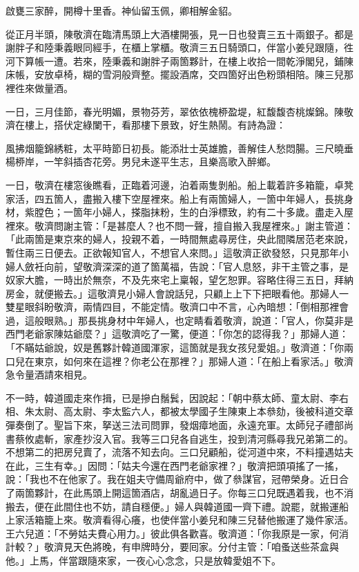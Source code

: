 啟甕三家醉，開樽十里香。神仙留玉佩，卿相解金貂。

從正月半頭，陳敬濟在臨清馬頭上大酒樓開張，見一日也發賣三五十兩銀子。都是謝胖子和陸秉義眼同經手，在櫃上掌櫃。敬濟三五日騎頭口，伴當小姜兒跟隨，徃河下算帳一遭。若來，陸秉義和謝胖子兩箇夥計，在樓上收拾一間乾淨閣兒，鋪陳床帳，安放卓椅，糊的雪洞般齊整。擺設酒席，交四箇好出色粉頭相陪。陳三兒那裡徃來做量酒。

一日，三月佳節，春光明媚，景物芬芳，翠依依槐桺盈堤，紅馥馥杏桃燦錦。陳敬濟在樓上，搭伏定綠闌干，看那樓下景致，好生熱鬧。有詩為證：

風拂烟籠錦綉粧，太平時節日初長。能添壯士英雄膽，善解佳人愁悶腸。三尺曉垂楊桺岸，一竿斜插杏花旁。男兒未遂平生志，且樂高歌入醉鄉。

一日，敬濟在樓窓後瞧看，正臨着河邊，泊着兩隻剝船。船上載着許多箱籠，卓凳家活，四五箇人，盡搬入樓下空屋裡來。船上有兩箇婦人，{}一箇中年婦人，長挑身材，紫膛色；一箇年小婦人，搽脂抹粉，生的白淨標致，約有二十多歲。盡走入屋裡來。{}敬濟問謝主管：「是甚麼人？也不問一聲，擅自搬入我屋裡來。」謝主管道：「此兩箇是東京來的婦人，投親不着，一時間無處尋房住，央此間隣居范老來說，暫住兩三日便去。正欲報知官人，不想官人來問。」這敬濟正欲發怒，只見那年小婦人斂衽向前，望敬濟深深的道了箇萬福，告說：「官人息怒，非干主管之事，是奴家大膽，一時出於無奈，不及先來宅上稟報，望乞恕罪。容略住得三五日，拜納房金，就便搬去。」這敬濟見小婦人會說話兒，只顧上上下下把眼看他。那婦人一雙星眼斜盼敬濟，兩情四目，不能定情。{}敬濟口中不言，心內暗想：「倒相那裡會過，這般眼熟。」那長挑身材中年婦人，也定睛看着敬濟，說道：「官人，你莫非是西門老爺家陳姑爺麼？」這敬濟吃了一驚，便道：「你怎的認得我？」那婦人道：「不瞞姑爺說，奴是舊夥計韓道國渾家，這箇就是我女孩兒愛姐。」敬濟道：「你兩口兒在東京，如何來在這裡？你老公在那裡？」{}那婦人道：「在船上看家活。」敬濟急令量酒請來相見。

不一時，韓道國走來作揖，已是摻白鬚鬂，{}因說起：「朝中蔡太師、童太尉、李右相、朱太尉、高太尉、李太監六人，都被太學國子生陳東上本叅劾，後被科道交章彈奏倒了。{}聖旨下來，拏送三法司問罪，發烟瘴地面，永遠充軍。太師兒子禮部尚書蔡攸處斬，家產抄沒入官。我等三口兒各自逃生，投到清河縣尋我兄弟第二的。不想第二的把房兒賣了，流落不知去向。三口兒顧船，從河道中來，不料撞遇姑夫在此，三生有幸。」因問：「姑夫今還在西門老爺家裡？」敬濟把頭項搖了一搖，說：「我也不在他家了。{}我在姐夫守備周爺府中，做了叅謀官，冠帶榮身。近日合了兩箇夥計，在此馬頭上開這箇酒店，胡亂過日子。你每三口兒既遇着我，也不消搬去，便在此間住也不妨，請自穩便。」婦人與韓道國一齊下禮。說罷，就搬運船上家活箱籠上來。敬濟看得心癢，也使伴當小姜兒和陳三兒替他搬運了幾件家活。{}王六兒道：「不勞姑夫費心用力。」彼此俱各歡喜。敬濟道：「你我原是一家，何消計較？」敬濟見天色將晚，有申牌時分，要囘家。分付主管：「咱蚤送些茶盒與他。」上馬，伴當跟隨來家，一夜心心念念，只是放韓愛姐不下。


